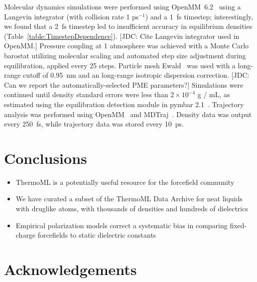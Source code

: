 \documentclass[aps,pre,twocolumn,nofootinbib,superscriptaddress,linenumbers]{revtex4-1}
\begin{document}
Molecular dynamics simulations were performed using OpenMM~6.2~\cite{eastman2012openmm} using a Langevin integrator (with collision rate 1 ps$^{-1}$) and a 1~fs timestep; interestingly, we found that a 2~fs timestep led to insufficient accuracy in equilibrium densities (Table~\ref{table:TimestepDependence}).  
{\color{red}[JDC: Cite Langevin integrator used in OpenMM.]}
Pressure coupling at 1 atmosphere was achieved with a Monte Carlo barostat utilizing molecular scaling and automated step size adjustment during equilibration, applied every 25 steps.  
Particle mesh Ewald~\cite{Darden1993} was used with a long-range cutoff of 0.95~nm and an long-range isotropic dispersion correction.  
{\color{red}[JDC: Can we report the automatically-selected PME parameters?]}
Simulations were continued until density standard errors were less than $2 \times 10^{-4}$ g / mL, as estimated using the equilibration detection module in pymbar 2.1~\cite{shirts2008statistically}.  
Trajectory analysis was performed using OpenMM~\cite{eastman2012openmm} and MDTraj~\cite{mcgibbon2014mdtraj}.  
Density data was output every 250~fs, while trajectory data was stored every 10~ps.  


\section{Conclusions}

\begin{itemize}
\item  ThermoML is a potentially useful resource for the forcefield community
\item  We have curated a subset of the ThermoML Data Archive for neat liquids with druglike atoms, with thousands of densities and hundreds of dielectrics
\item  Empirical polarization models correct a systematic bias in comparing fixed-charge forcefields to static dielectric constants
\end{itemize}


\section{Acknowledgements}
\end{document}
